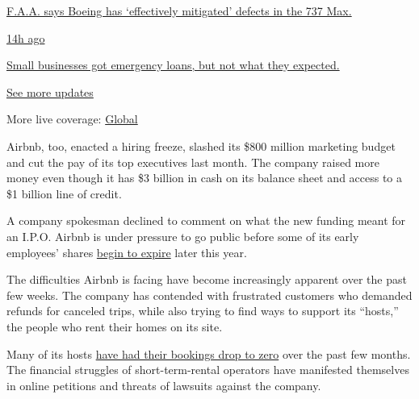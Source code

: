\href{https://www.nytimes3xbfgragh.onion/live/2020/08/03/business/stock-market-today-coronavirus?action=click\&pgtype=Article\&state=default\&region=MAIN_CONTENT_1\&context=storylines_live_updates\#faa-says-boeing-has-effectively-mitigated-defects-in-the-737-max}{F.A.A.
says Boeing has `effectively mitigated' defects in the 737 Max.}

\href{https://www.nytimes3xbfgragh.onion/live/2020/08/03/business/stock-market-today-coronavirus?action=click\&pgtype=Article\&state=default\&region=MAIN_CONTENT_1\&context=storylines_live_updates\#small-businesses-got-emergency-loans-but-not-what-they-expected}{14h
ago}

\href{https://www.nytimes3xbfgragh.onion/live/2020/08/03/business/stock-market-today-coronavirus?action=click\&pgtype=Article\&state=default\&region=MAIN_CONTENT_1\&context=storylines_live_updates\#small-businesses-got-emergency-loans-but-not-what-they-expected}{Small
businesses got emergency loans, but not what they expected.}

\href{https://www.nytimes3xbfgragh.onion/live/2020/08/03/business/stock-market-today-coronavirus?action=click\&pgtype=Article\&state=default\&region=MAIN_CONTENT_1\&context=storylines_live_updates}{See
more updates}

More live coverage:
\href{https://www.nytimes3xbfgragh.onion/2020/08/03/world/coronavirus-covid-19.html?action=click\&pgtype=Article\&state=default\&region=MAIN_CONTENT_1\&context=storylines_live_updates}{Global}

Airbnb, too, enacted a hiring freeze, slashed its \$800 million
marketing budget and cut the pay of its top executives last month. The
company raised more money even though it has \$3 billion in cash on its
balance sheet and access to a \$1 billion line of credit.

A company spokesman declined to comment on what the new funding meant
for an I.P.O. Airbnb is under pressure to go public before some of its
early employees' shares
\href{https://www.nytimes3xbfgragh.onion/2019/09/20/technology/airbnb-employees-ipo-payouts.html}{begin
to expire} later this year.

The difficulties Airbnb is facing have become increasingly apparent over
the past few weeks. The company has contended with frustrated customers
who demanded refunds for canceled trips, while also trying to find ways
to support its ``hosts,'' the people who rent their homes on its site.

Many of its hosts
\href{https://www.nytimes3xbfgragh.onion/2020/03/10/technology/airbnb-hosts-coronavirus.html}{have
had their bookings drop to zero} over the past few months. The financial
struggles of short-term-rental operators have manifested themselves in
online petitions and threats of lawsuits against the company.

